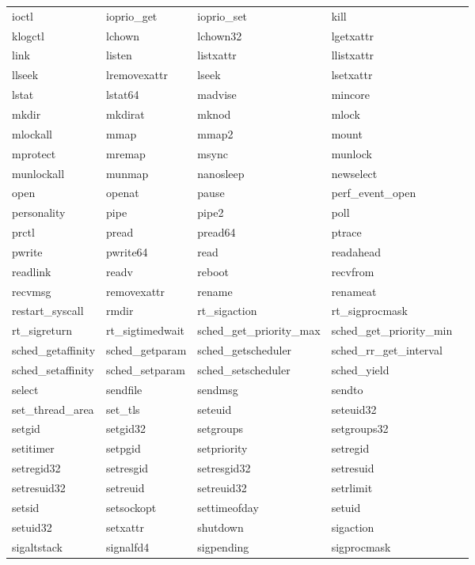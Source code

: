 \begin{center}
\begin{table}
\begin{tabular}{l p{3.5cm} p{3.5cm} p{3.5cm} p{3.5cm}|}
\hline
ioctl & ioprio\_get & ioprio\_set & kill \\
klogctl & lchown & lchown32 & lgetxattr \\
link & listen & listxattr & llistxattr \\
llseek & lremovexattr & lseek & lsetxattr \\
lstat & lstat64 & madvise & mincore \\
mkdir & mkdirat & mknod & mlock \\
mlockall & mmap & mmap2 & mount \\
mprotect & mremap & msync & munlock \\
munlockall & munmap & nanosleep & newselect \\
open & openat & pause & perf\_event\_open \\
personality & pipe & pipe2 & poll \\
prctl & pread & pread64 & ptrace \\
pwrite & pwrite64 & read & readahead \\
readlink & readv & reboot & recvfrom \\
recvmsg & removexattr & rename & renameat \\
restart\_syscall & rmdir & rt\_sigaction & rt\_sigprocmask \\
rt\_sigreturn & rt\_sigtimedwait & sched\_get\_priority\_max & sched\_get\_priority\_min \\
sched\_getaffinity & sched\_getparam & sched\_getscheduler & sched\_rr\_get\_interval \\
sched\_setaffinity & sched\_setparam & sched\_setscheduler & sched\_yield \\
select & sendfile & sendmsg & sendto \\
set\_thread\_area & set\_tls & seteuid & seteuid32 \\
setgid & setgid32 & setgroups & setgroups32 \\
setitimer & setpgid & setpriority & setregid \\
setregid32 & setresgid & setresgid32 & setresuid \\
setresuid32 & setreuid & setreuid32 & setrlimit \\
setsid & setsockopt & settimeofday & setuid \\
setuid32 & setxattr & shutdown & sigaction \\
sigaltstack & signalfd4 & sigpending & sigprocmask \\

\end{tabular}
\end{table}
\end{center}
